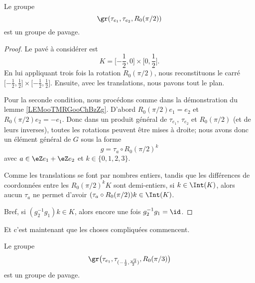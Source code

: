 \newcommand{\CaptionFigATJSooefYkmCbP}{Le compact \( K\) et son image par \( R_0(\pi)\) pour le lemme \ref{LEMooTMRGooChBzZg}.}


\begin{lemma}         \label{LEMooJPNDooHDCLnY}
	Le groupe
	\begin{equation}
		\gr(\tau_{e_1}, \tau_{e_2}, R_0(\pi/2))
	\end{equation}
	est un groupe de pavage.
\end{lemma}

\begin{proof}
	Le pavé à considérer est
	\begin{equation}
		K=\mathopen[ -\frac{ 1 }{2} , 0 \mathclose]\times \mathopen[ 0 , \frac{ 1 }{2} \mathclose].
	\end{equation}
	En lui appliquant trois fois la rotation \( R_0(\pi/2)\), nous reconstituons le carré \( \mathopen[ -\frac{ 1 }{2} , \frac{ 1 }{2} \mathclose]\times \mathopen[ -\frac{ 1 }{2} , \frac{ 1 }{2} \mathclose]\). Ensuite, avec les translations, nous pavons tout le plan.

	Pour la seconde condition, nous procédons comme dans la démonstration du lemme \ref{LEMooTMRGooChBzZg}. D'abord \( R_0(\pi/2)e_1=e_2\) et \( R_0(\pi/2)e_2=-e_1\). Donc dans un produit général de \( \tau_{e_1}\), \( \tau_{e_2}\) et \( R_0(\pi/2)\) (et de leurs inverses), toutes les rotations peuvent être mises à droite; nous avons donc un élément général de \( G\) sous la forme
	\begin{equation}
		g=\tau_a\circ R_0(\pi/2)^k
	\end{equation}
	avec \( a\in \eZ e_1+\eZ e_2\) et \( k\in \{ 0,1,2,3 \}\).

	Comme les translations se font par nombres entiers, tandis que les différences de coordonnées entre les \( R_0(\pi/2)^kK\) sont demi-entiers, si \( k\in \Int(K)\), alors aucun \( \tau_a\) ne permet d'avoir \( (\tau_a\circ R_0(\pi/2))k\in \Int(K)\).

	Bref, si \( (g_2^{-1}g_1)k\in K\), alors encore une fois \( g_2^{-1}g_1=\id\).
\end{proof}

Et c'est maintenant que les choses compliquées commencent.

\begin{lemma}       \label{LEMooMWWEooEbZXtb}
	Le groupe
	\begin{equation}
		\gr\big( \tau_{e_1},\tau_{(-\frac{ 1 }{2},\frac{ \sqrt{ 3 } }{2})},R_0(\pi/3) \big)
	\end{equation}
	est un groupe de pavage.
\end{lemma}

